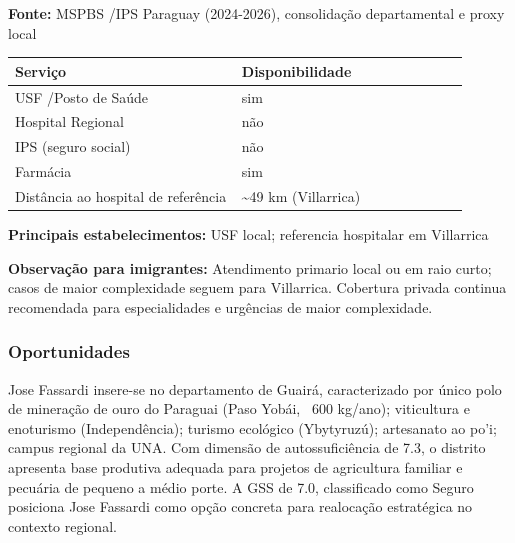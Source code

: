 \textbf{Fonte:} MSPBS /\allowbreak  IPS Paraguay (2024-2026), consolidação
departamental e proxy local

{\def\LTcaptype{none} %
\begin{longtable}{@{}>{\raggedright\arraybackslash}p{0.45\linewidth} >{\raggedright\arraybackslash}p{0.45\linewidth}@{}}
\toprule\noalign{}
Serviço & Disponibilidade \\
\midrule\noalign{}
\endhead
\bottomrule\noalign{}
\endlastfoot
USF /\allowbreak  Posto de Saúde & sim \\
Hospital Regional & não \\
IPS (seguro social) & não \\
Farmácia & sim \\
Distância ao hospital de referência & \textasciitilde49 km
(Villarrica) \\
\end{longtable}
}

\textbf{Principais estabelecimentos:} USF local; referencia hospitalar
em Villarrica

\textbf{Observação para imigrantes:} Atendimento primario local ou em
raio curto; casos de maior complexidade seguem para Villarrica.
Cobertura privada continua recomendada para especialidades e urgências
de maior complexidade.
\newpage

\subsubsection*{Oportunidades}\label{oport-jose-fassardi-0410}
Jose Fassardi insere-se no departamento de Guairá, caracterizado por único polo de mineração de ouro do Paraguai (Paso Yobái, ~600 kg/ano); viticultura e enoturismo (Independência); turismo ecológico (Ybytyruzú); artesanato ao po'i; campus regional da UNA. Com dimensão de autossuficiência de 7.3, o distrito apresenta base produtiva adequada para projetos de agricultura familiar e pecuária de pequeno a médio porte. A GSS de 7.0, classificado como Seguro posiciona Jose Fassardi como opção concreta para realocação estratégica no contexto regional.

